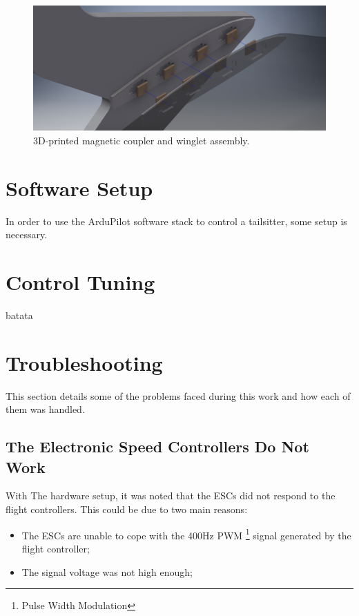 \begin{figure}[H]
\centering
  \includegraphics[width=\linewidth]{figs/magnetassembly.png}
  \caption{3D-printed magnetic coupler and winglet assembly.}
  \label{fig:magnetcoupler}
\end{figure}
	

\section{Software Setup}

In order to use the ArduPilot software stack to control a tailsitter, some setup is necessary.

\section{Control Tuning}

batata
	

\section{Troubleshooting}

This section details some of the problems faced during this work and how each of them was handled.

\subsection{The Electronic Speed Controllers Do Not Work}
With The hardware setup, it was noted that the ESCs did not respond to the flight controllers. This could be due to two main reasons:
\begin{itemize}
\item The ESCs are unable to cope with the 400Hz PWM \footnote{Pulse Width Modulation} signal generated by the flight controller;
\item The signal voltage was not high enough;
\end{itemize}

